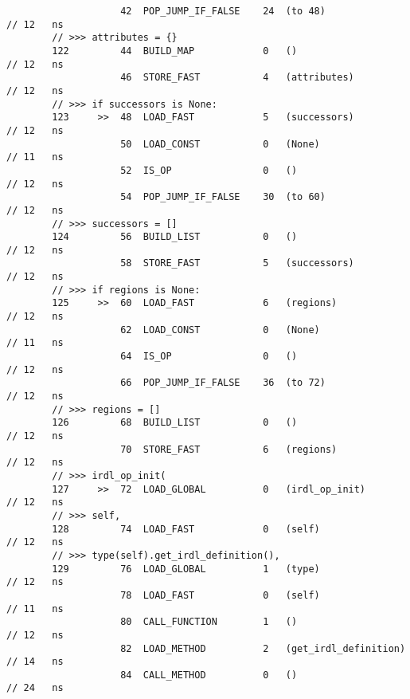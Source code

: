 \begin{code}
\begin{verbatim}
                    42  POP_JUMP_IF_FALSE    24  (to 48)                                            // 12   ns
        // >>> attributes = {}
        122         44  BUILD_MAP            0   ()                                                 // 12   ns
                    46  STORE_FAST           4   (attributes)                                       // 12   ns
        // >>> if successors is None:
        123     >>  48  LOAD_FAST            5   (successors)                                       // 12   ns
                    50  LOAD_CONST           0   (None)                                             // 11   ns
                    52  IS_OP                0   ()                                                 // 12   ns
                    54  POP_JUMP_IF_FALSE    30  (to 60)                                            // 12   ns
        // >>> successors = []
        124         56  BUILD_LIST           0   ()                                                 // 12   ns
                    58  STORE_FAST           5   (successors)                                       // 12   ns
        // >>> if regions is None:
        125     >>  60  LOAD_FAST            6   (regions)                                          // 12   ns
                    62  LOAD_CONST           0   (None)                                             // 11   ns
                    64  IS_OP                0   ()                                                 // 12   ns
                    66  POP_JUMP_IF_FALSE    36  (to 72)                                            // 12   ns
        // >>> regions = []
        126         68  BUILD_LIST           0   ()                                                 // 12   ns
                    70  STORE_FAST           6   (regions)                                          // 12   ns
        // >>> irdl_op_init(
        127     >>  72  LOAD_GLOBAL          0   (irdl_op_init)                                     // 12   ns
        // >>> self,
        128         74  LOAD_FAST            0   (self)                                             // 12   ns
        // >>> type(self).get_irdl_definition(),
        129         76  LOAD_GLOBAL          1   (type)                                             // 12   ns
                    78  LOAD_FAST            0   (self)                                             // 11   ns
                    80  CALL_FUNCTION        1   ()                                                 // 12   ns
                    82  LOAD_METHOD          2   (get_irdl_definition)                              // 14   ns
                    84  CALL_METHOD          0   ()                                                 // 24   ns


\end{verbatim}
\end{code}
